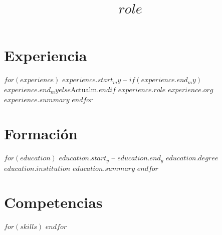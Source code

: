 \documentclass[11pt,a4paper,sans]{moderncv}
\title{$role$}
\begin{document}
\makecvtitle

\section{Experiencia}
$for(experience)$
\cventry
  {$experience.start_my$ -- $if(experience.end_my)$$experience.end_my$$else$Actualm.$endif$}
  {$experience.role$}
  {$experience.org$}
  {}
  {}
  {$experience.summary$}
$endfor$

\newpage
\section{Formación}
$for(education)$
\cventry
  {$education.start_y$ -- $education.end_y$}
  {$education.degree$}
  {$education.institution$}
  {}
  {}
  {$education.summary$}
$endfor$

\section{Competencias}
$for(skills)$
$endfor$
\end{document}
